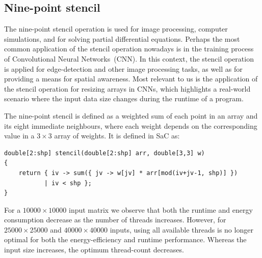 \documentclass[runningheads]{llncs}
\begin{document}
\subsection{Nine-point stencil}\label{sec:stencil}
The nine-point stencil operation is used for image processing, computer simulations, and for solving partial differential equations.
Perhaps the most common application of the stencil operation nowadays is in the training process of Convolutional Neural Networks~(CNN).
In this context, the stencil operation is applied for edge-detection and other image processing tasks, as well as for providing a means for spatial awareness.
Most relevant to us is the application of the stencil operation for resizing arrays in CNNs, which highlights a real-world scenario where the input data size changes during the runtime of a program.

The nine-point stencil is defined as a weighted sum of each point in an array and its eight immediate neighbours, where each weight depends on the corresponding value in a $3 \times 3$ array of weights.
It is defined in SaC as:
\begin{verbatim}
double[2:shp] stencil(double[2:shp] arr, double[3,3] w)
{
    return { iv -> sum({ jv -> w[jv] * arr[mod(iv+jv-1, shp)] })
           | iv < shp };
}
\end{verbatim}

For a $10000 \times 10000$ input matrix we observe that both the runtime and energy consumption decrease as the number of threads increases.
However, for $25000 \times 25000$ and $40000 \times 40000$ inputs, using all available threads is no longer optimal for both the energy-efficiency and runtime performance.
Whereas the input size increases, the optimum thread-count decreases.
\end{document}
